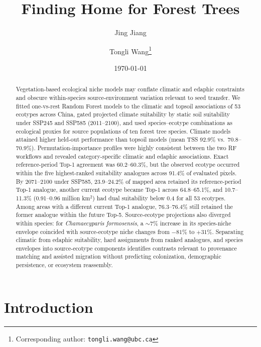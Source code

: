 \documentclass[11pt]{article}
\title{Finding Home for Forest Trees}
\author[1]{Jing Jiang}
\author[1]{Tongli Wang\thanks{Corresponding author: \texttt{tongli.wang@ubc.ca}}}
\affil[1]{Department of Forest and Conservation Sciences, Faculty of Forestry,
The University of British Columbia, Vancouver, BC, Canada}
\date{\today}
\begin{document}
\maketitle
\thispagestyle{plain}

\begin{abstract}
Vegetation-based ecological niche models may conflate climatic and edaphic
constraints and obscure within-species source-environment variation relevant
to seed transfer. We fitted one-vs-rest Random Forest models to the climatic
and topsoil associations of 53 ecotypes across China, gated projected climate
suitability by static soil suitability under SSP245 and SSP585 (2011--2100),
and used species--ecotype combinations as ecological proxies for source
populations of ten forest tree species. Climate models attained higher
held-out performance than topsoil models (mean TSS 92.9\% vs.\ 70.8--70.9\%).
Permutation-importance profiles were highly consistent between the two RF
workflows and revealed category-specific climatic and edaphic associations.
Exact reference-period Top-1 agreement was 60.2--60.3\%, but the observed
ecotype occurred within the five highest-ranked suitability analogues across
91.4\% of evaluated pixels. By 2071--2100 under SSP585, 23.9--24.2\% of mapped
area retained its reference-period Top-1 analogue, another current ecotype
became Top-1 across 64.8--65.1\%, and 10.7--11.3\% (0.91--0.96 million
km$^2$) had dual suitability below 0.4 for all 53 ecotypes. Among areas with a
different current Top-1 analogue, 76.3--76.4\% still retained the former
analogue within the future Top-5. Source-ecotype projections also diverged
within species: for \textit{Chamaecyparis formosensis}, a $\sim$7\% increase
in its species-niche envelope coincided with source-ecotype niche changes from
$-81\%$ to $+31\%$. Separating climatic from edaphic suitability, hard
assignments from ranked analogues, and species envelopes into source-ecotype
components identifies contrasts relevant to provenance matching and assisted
migration without predicting colonization, demographic persistence, or
ecosystem reassembly.
\end{abstract}

\section{Introduction}
\end{document}

